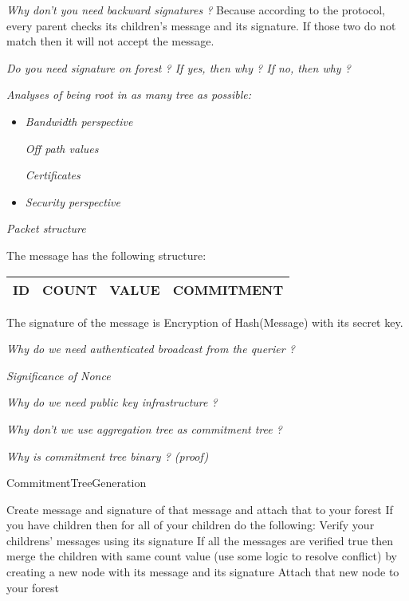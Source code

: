 \textit{Why don't you need backward signatures ?} Because according to the protocol, every parent checks its children's message and its signature. If those two do not match then it will not accept the message.

\textit{Do you need signature on forest ? If yes, then why ? If no, then why ?}

\textit{Analyses of being root in as many tree as possible:}
	
	\begin{itemize}
		\item \textit{Bandwidth perspective}
	
			\textit{Off path values}
	
			\textit{Certificates}

		\item \textit{Security perspective}
	\end{itemize}

\textit{Packet structure}

	The message has the following structure:

	\begin{tabular}{ | l | l | l | l |}
		\hline
		ID & COUNT & VALUE & COMMITMENT\\
		\hline
	\end{tabular}

	The signature of the message is Encryption of Hash(Message) with its secret key.
	
\textit{Why do we need authenticated broadcast from the querier ?}

\textit{Significance of Nonce}

\textit{Why do we need public key infrastructure ?}

\textit{Why don't we use aggregation tree as commitment tree ?}

\textit{Why is commitment tree binary ? (proof)}

\begin{algorithm}[H]
\caption {CommitmentTreeGeneration}\label{number3}
	\begin {algorithmic}[1]
			\STATE Create message and signature of that message and attach that to your forest
			\STATE If you have children then for all of your children do the following:
			\STATE Verify your childrens' messages using its signature 
			\STATE If all the messages are verified true then merge the children with same count value (use some logic to resolve conflict) by creating a new node with its message and its signature 
			\STATE Attach that new node to your forest
		\ENDFOR
	\end{algorithmic}
\end{algorithm}

